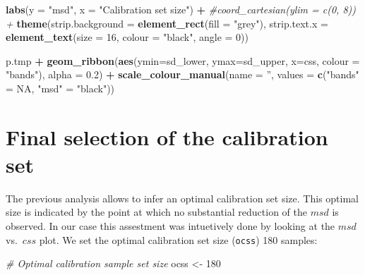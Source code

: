 \documentclass[]{book}
\newenvironment{Shaded}{\begin{snugshade}}{\end{snugshade}}
\newcommand{\CommentTok}[1]{\textcolor[rgb]{0.56,0.35,0.01}{\textit{#1}}}
\newcommand{\DataTypeTok}[1]{\textcolor[rgb]{0.13,0.29,0.53}{#1}}
\newcommand{\DecValTok}[1]{\textcolor[rgb]{0.00,0.00,0.81}{#1}}
\newcommand{\FloatTok}[1]{\textcolor[rgb]{0.00,0.00,0.81}{#1}}
\newcommand{\KeywordTok}[1]{\textcolor[rgb]{0.13,0.29,0.53}{\textbf{#1}}}
\newcommand{\NormalTok}[1]{#1}
\newcommand{\OperatorTok}[1]{\textcolor[rgb]{0.81,0.36,0.00}{\textbf{#1}}}
\newcommand{\OtherTok}[1]{\textcolor[rgb]{0.56,0.35,0.01}{#1}}
\newcommand{\StringTok}[1]{\textcolor[rgb]{0.31,0.60,0.02}{#1}}
\begin{document}
\begin{Shaded}
\begin{Highlighting}[]
\StringTok{  }\KeywordTok{labs}\NormalTok{(}\DataTypeTok{y =} \StringTok{"msd"}\NormalTok{, }\DataTypeTok{x =} \StringTok{"Calibration set size"}\NormalTok{) }\OperatorTok{+}
\StringTok{  }\CommentTok{#coord_cartesian(ylim = c(0, 8)) + }
\StringTok{  }\KeywordTok{theme}\NormalTok{(}\DataTypeTok{strip.background =} \KeywordTok{element_rect}\NormalTok{(}\DataTypeTok{fill =} \StringTok{"grey"}\NormalTok{), }
        \DataTypeTok{strip.text.x =} \KeywordTok{element_text}\NormalTok{(}\DataTypeTok{size =} \DecValTok{16}\NormalTok{, }\DataTypeTok{colour =} \StringTok{"black"}\NormalTok{, }\DataTypeTok{angle =} \DecValTok{0}\NormalTok{)) }
        
\NormalTok{p.tmp }\OperatorTok{+}\StringTok{ }
\StringTok{  }\KeywordTok{geom_ribbon}\NormalTok{(}\KeywordTok{aes}\NormalTok{(}\DataTypeTok{ymin=}\NormalTok{sd_lower, }\DataTypeTok{ymax=}\NormalTok{sd_upper, }\DataTypeTok{x=}\NormalTok{css, }\DataTypeTok{colour =} \StringTok{"bands"}\NormalTok{), }\DataTypeTok{alpha =} \FloatTok{0.2}\NormalTok{) }\OperatorTok{+}
\StringTok{  }\KeywordTok{scale_colour_manual}\NormalTok{(}\DataTypeTok{name =} \StringTok{''}\NormalTok{, }\DataTypeTok{values =} \KeywordTok{c}\NormalTok{(}\StringTok{"bands"}\NormalTok{ =}\StringTok{ }\OtherTok{NA}\NormalTok{, }\StringTok{"msd"}\NormalTok{ =}\StringTok{ "black"}\NormalTok{))}
\end{Highlighting}
\end{Shaded}

\hypertarget{final-selection-of-the-calibration-set}{%
\section{Final selection of the calibration set}\label{final-selection-of-the-calibration-set}}

The previous analysis allows to infer an optimal calibration set size. This optimal size is indicated by the point at which no substantial reduction of the \(msd\) is observed. In our case this assestment was intuetively done by looking at the \(msd\) vs.~\(css\) plot. We set the optimal calibration set size (\texttt{ocss}) 180 samples:

\begin{Shaded}
\begin{Highlighting}[]
\CommentTok{# Optimal calibration sample set size}
\NormalTok{ocss <-}\StringTok{ }\DecValTok{180}
\end{Highlighting}
\end{Shaded}
\end{document}
